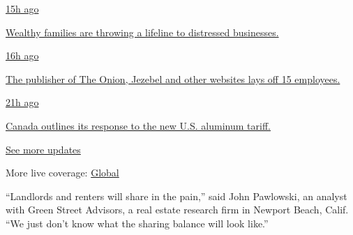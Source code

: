 \href{https://www.nytimes.com/live/2020/08/07/business/stock-market-today-coronavirus?action=click\&pgtype=Article\&state=default\&region=MAIN_CONTENT_1\&context=storylines_live_updates\#wealthy-families-are-throwing-a-lifeline-to-distressed-businesses}{15h
ago}

\href{https://www.nytimes.com/live/2020/08/07/business/stock-market-today-coronavirus?action=click\&pgtype=Article\&state=default\&region=MAIN_CONTENT_1\&context=storylines_live_updates\#wealthy-families-are-throwing-a-lifeline-to-distressed-businesses}{Wealthy
families are throwing a lifeline to distressed businesses.}

\href{https://www.nytimes.com/live/2020/08/07/business/stock-market-today-coronavirus?action=click\&pgtype=Article\&state=default\&region=MAIN_CONTENT_1\&context=storylines_live_updates\#the-publisher-of-the-onion-jezebel-and-other-websites-lays-off-15-employees}{16h
ago}

\href{https://www.nytimes.com/live/2020/08/07/business/stock-market-today-coronavirus?action=click\&pgtype=Article\&state=default\&region=MAIN_CONTENT_1\&context=storylines_live_updates\#the-publisher-of-the-onion-jezebel-and-other-websites-lays-off-15-employees}{The
publisher of The Onion, Jezebel and other websites lays off 15
employees.}

\href{https://www.nytimes.com/live/2020/08/07/business/stock-market-today-coronavirus?action=click\&pgtype=Article\&state=default\&region=MAIN_CONTENT_1\&context=storylines_live_updates\#canada-outlines-its-response-to-the-new-us-aluminum-tariff}{21h
ago}

\href{https://www.nytimes.com/live/2020/08/07/business/stock-market-today-coronavirus?action=click\&pgtype=Article\&state=default\&region=MAIN_CONTENT_1\&context=storylines_live_updates\#canada-outlines-its-response-to-the-new-us-aluminum-tariff}{Canada
outlines its response to the new U.S. aluminum tariff.}

\href{https://www.nytimes.com/live/2020/08/07/business/stock-market-today-coronavirus?action=click\&pgtype=Article\&state=default\&region=MAIN_CONTENT_1\&context=storylines_live_updates}{See
more updates}

More live coverage:
\href{https://www.nytimes.com/2020/08/07/world/covid-19-news.html?action=click\&pgtype=Article\&state=default\&region=MAIN_CONTENT_1\&context=storylines_live_updates}{Global}

``Landlords and renters will share in the pain,'' said John Pawlowski,
an analyst with Green Street Advisors, a real estate research firm in
Newport Beach, Calif. ``We just don't know what the sharing balance will
look like.''

